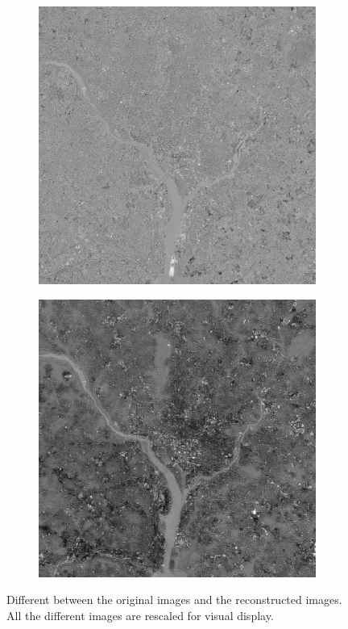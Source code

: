 \begin{figure}[h!]
\begin{subfigure}[b]{0.3\linewidth}
		\caption{}
		\label{fig:10different4}
	\end{subfigure}
	\begin{subfigure}[b]{0.3\linewidth}
		\includegraphics[width=\linewidth]{myfigure/p10/10_different_5.png}
		\caption{}
		\label{fig:10different5}
	\end{subfigure}
	\begin{subfigure}[b]{0.3\linewidth}
		\includegraphics[width=\linewidth]{myfigure/p10/10_different_6.png}
		\caption{}
		\label{fig:10different6}
	\end{subfigure}
	
	\caption{Different between the original images and the reconstructed images. All the different images are rescaled for visual display.}
	\label{fig:10different}
\end{figure}
